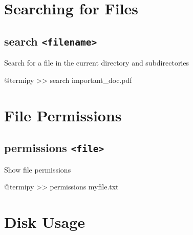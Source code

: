 \documentclass[
  letterpaper,
  DIV=11,
  numbers=noendperiod]{scrreprt}
\newenvironment{Shaded}{\begin{snugshade}}{\end{snugshade}}
\newcommand{\ExtensionTok}[1]{\textcolor[rgb]{0.00,0.23,0.31}{#1}}
\newcommand{\NormalTok}[1]{\textcolor[rgb]{0.00,0.23,0.31}{#1}}
\newcommand{\OperatorTok}[1]{\textcolor[rgb]{0.37,0.37,0.37}{#1}}
\begin{document}
\section*{Searching for Files}\label{searching-for-files}


\subsection*{\texorpdfstring{search
\texttt{\textless{}filename\textgreater{}}}{search \textless filename\textgreater{}}}\label{search-filename}

Search for a file in the current directory and subdirectories

\begin{Shaded}
\begin{Highlighting}[]
\ExtensionTok{@termipy} \OperatorTok{\textgreater{}\textgreater{}}\NormalTok{ search important\_doc.pdf}
\end{Highlighting}
\end{Shaded}

\section*{File Permissions}\label{file-permissions}


\subsection*{\texorpdfstring{permissions
\texttt{\textless{}file\textgreater{}}}{permissions \textless file\textgreater{}}}\label{permissions-file}

Show file permissions

\begin{Shaded}
\begin{Highlighting}[]
\ExtensionTok{@termipy} \OperatorTok{\textgreater{}\textgreater{}}\NormalTok{ permissions myfile.txt}
\end{Highlighting}
\end{Shaded}

\section*{Disk Usage}\label{disk-usage}
\end{document}
